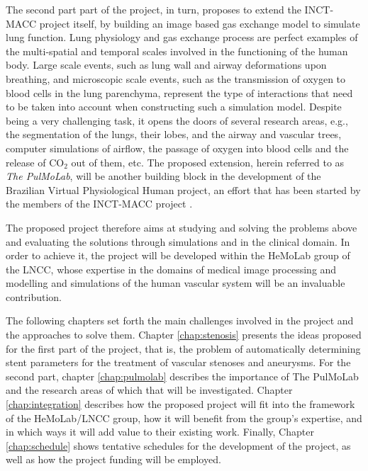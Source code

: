 The second part part of the project, in turn, proposes to extend the INCT-MACC project itself, by building an image based gas exchange model to simulate lung function. Lung physiology and gas exchange process are perfect examples of the multi-spatial and temporal scales involved in the functioning of the human body. Large scale events, such as lung wall and airway deformations upon breathing, and microscopic scale events, such as the transmission of oxygen to blood cells in the lung parenchyma, represent the type of interactions that need to be taken into account when constructing such a simulation model. Despite being a very challenging task, it opens the doors of several research areas, e.g., the segmentation of the lungs, their lobes, and the airway and vascular trees, computer simulations of airflow, the passage of oxygen into blood cells and the release of CO$_2$ out of them, etc. The proposed extension, herein referred to as {\em The PulMoLab}, will be another building block in the development of the 
Brazilian Virtual Physiological Human project, an effort that has been started by the members of the INCT-MACC project \citep{Blanco2010,Blanco2009a,Blanco2012,Urquiza2006,Larrabide2007}. 

The proposed project therefore aims at studying and solving the problems above and evaluating the solutions through simulations and in the clinical domain. In order to achieve it, the project will be developed within the HeMoLab group of the LNCC, whose expertise in the domains of medical image processing and modelling and simulations of the human vascular system will be an invaluable contribution.

The following chapters set forth the main challenges involved in the project and the approaches to solve them. Chapter \ref{chap:stenosis} presents the ideas proposed for the first part of the project, that is, the problem of automatically determining stent parameters for the treatment of vascular stenoses and aneurysms. For the second part, chapter \ref{chap:pulmolab} describes the importance of The PulMoLab and the research areas of which that will be investigated. Chapter \ref{chap:integration} describes how the proposed project will fit into the framework of the HeMoLab/LNCC group, how it will benefit from the group's expertise, and in which ways it will add value to their existing work. Finally, Chapter \ref{chap:schedule} shows tentative schedules for the development of the project, as well as how the project funding will be employed.


